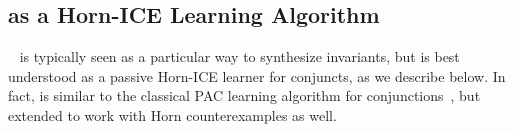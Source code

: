 \subsection{\houdini as a Horn-ICE Learning Algorithm}
\label{sec:houdini}

\houdini~\cite{DBLP:conf/fm/FlanaganL01} is typically seen as a particular way to synthesize invariants, but is best understood as a passive Horn-ICE learner for conjuncts, as we describe below.
In fact, \houdini is similar to the classical PAC learning algorithm for conjunctions~\cite{Kearns:1994:ICL:200548}, but extended to work with Horn counterexamples as well.

